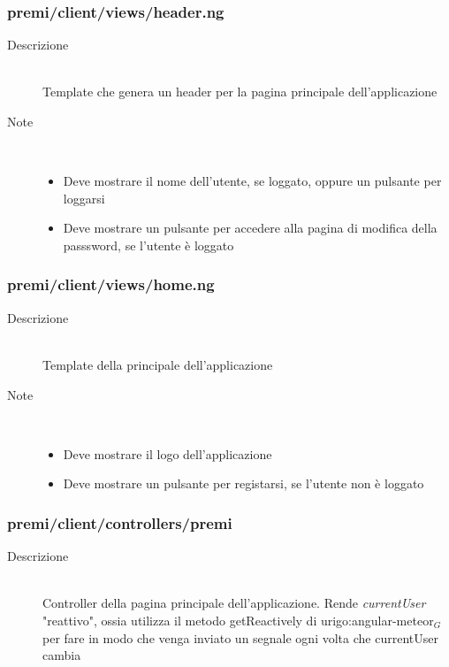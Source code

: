 \subsubsection{premi/client/views/header.ng}

\begin{description}
\item[Descrizione] \hfill \\
	Template che genera un header per la pagina principale dell'applicazione
	\item[Note] \hfill \\
	\begin{itemize}
			\item Deve mostrare il nome dell'utente, se loggato, oppure un pulsante per loggarsi
			\item Deve mostrare un pulsante per accedere alla pagina di modifica della passsword, se l'utente è loggato
	\end{itemize}
\end{description}

\subsubsection{premi/client/views/home.ng}

\begin{description}
\item[Descrizione] \hfill \\
	Template della principale dell'applicazione
	\item[Note] \hfill \\
	\begin{itemize}
			\item Deve mostrare il logo dell'applicazione
			\item Deve mostrare un pulsante per registarsi, se l'utente non è loggato
	\end{itemize}
\end{description}

\subsubsection{premi/client/controllers/premi}

\begin{description}
\item[Descrizione] \hfill \\
	Controller della pagina principale dell'applicazione. Rende \textit{currentUser} "reattivo", ossia utilizza il metodo getReactively di urigo:angular-meteor$_G$ per fare in modo che venga inviato un segnale ogni volta che currentUser cambia
\end{description}

